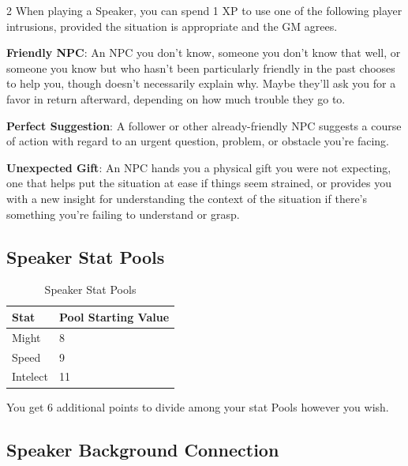 \begin{multicols}{2}
When playing a Speaker, you can spend 1 XP to use one of the following player intrusions, provided the situation is appropriate and the GM agrees.

\textbf{Friendly NPC}: An NPC you don’t know, someone you don’t know that well, or someone you know but who hasn’t been particularly friendly in the past chooses to help you, though doesn’t necessarily explain why. Maybe they’ll ask you for a favor in return afterward, depending on how much trouble they go to.

\textbf{Perfect Suggestion}: A follower or other already-friendly NPC suggests a course of action with regard to an urgent question, problem, or obstacle you’re facing.

\textbf{Unexpected Gift}: An NPC hands you a physical gift you were not expecting, one that helps put the situation at ease if things seem strained, or provides you with a new insight for understanding the context of the situation if there’s something you’re failing to understand or grasp.

\subsection{Speaker Stat Pools}

\begin{table}[H]
\centering
\caption{Speaker Stat Pools}
\label{tab: Speaker Stat Pools}

\begin{tabularx}{\linewidth}{| X | X |}
\hline
\textbf{Stat} & \textbf{Pool Starting Value} \\
\hline
Might & 8 \\ \hline
Speed & 9 \\ \hline
Intelect & 11  \\ \hline

\end{tabularx}

\end{table}

\raggedright

You get 6 additional points to divide among your stat Pools however you wish. 

\subsection{Speaker Background Connection}


\end{multicols}
